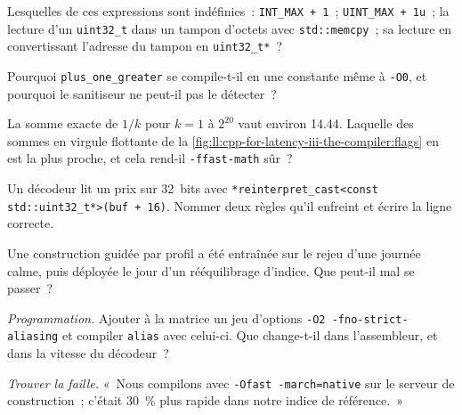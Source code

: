 \begin{exercise}[$\star$]\label{exo:ll:cpp-for-latency-iii-the-compiler:2}
Lesquelles de ces expressions sont indéfinies~: \texttt{INT\_MAX + 1}~; \texttt{UINT\_MAX + 1u}~; la lecture d'un \texttt{uint32\_t} dans un tampon d'octets
avec \texttt{std::memcpy}~; sa lecture en convertissant l'adresse du tampon en \texttt{uint32\_t*}~?
\end{exercise}

\begin{exercise}[$\star$]\label{exo:ll:cpp-for-latency-iii-the-compiler:3}
Pourquoi \texttt{plus\_one\_greater} se compile-t-il en une constante même à \texttt{-O0}, et pourquoi le sanitiseur ne peut-il pas le détecter~?
\end{exercise}

\begin{exercise}[$\star\star$]\label{exo:ll:cpp-for-latency-iii-the-compiler:4}
La somme exacte de $1/k$ pour $k = 1$ à $2^{20}$ vaut environ 14.44. Laquelle des sommes en virgule flottante de la
\cref{fig:ll:cpp-for-latency-iii-the-compiler:flags} en est la plus proche, et cela rend-il \texttt{-ffast-math} sûr~?
\end{exercise}

\begin{exercise}[$\star\star$]\label{exo:ll:cpp-for-latency-iii-the-compiler:5}
Un décodeur lit un prix sur 32~bits avec \texttt{*reinterpret\_cast<const std::uint32\_t*>(buf + 16)}. Nommer deux règles
qu'il enfreint et écrire la ligne correcte.
\end{exercise}

\begin{exercise}[$\star\star$]\label{exo:ll:cpp-for-latency-iii-the-compiler:6}
Une construction guidée par profil a été entraînée sur le rejeu d'une journée calme, puis déployée le jour d'un rééquilibrage
d'indice. Que peut-il mal se passer~?
\end{exercise}

\begin{exercise}[$\star\star\star$]\label{exo:ll:cpp-for-latency-iii-the-compiler:7}
\emph{Programmation.} Ajouter à la matrice un jeu d'options \texttt{-O2 -fno-strict-aliasing} et compiler \texttt{alias} avec celui-ci. Que
change-t-il dans l'assembleur, et dans la vitesse du décodeur~?
\end{exercise}

\begin{exercise}[$\star\star\star$]\label{exo:ll:cpp-for-latency-iii-the-compiler:8}
\emph{Trouver la faille.} «~Nous compilons avec \texttt{-Ofast -march=native} sur le serveur de construction~; c'était 30~\% plus
rapide dans notre indice de référence.~»
\end{exercise}

